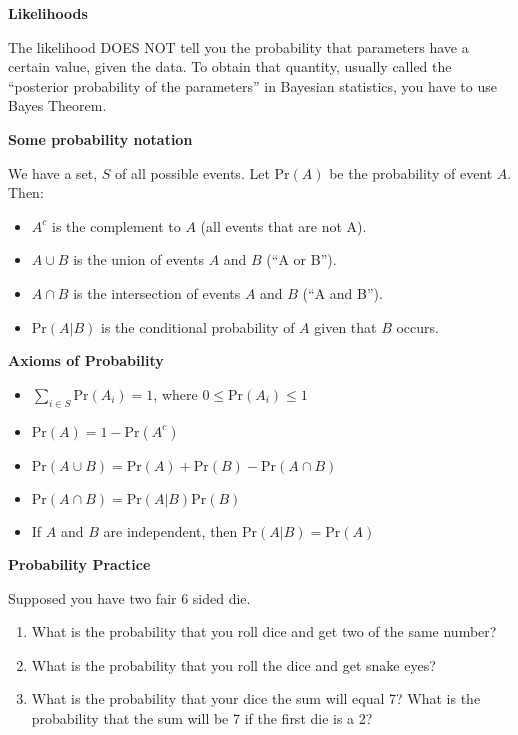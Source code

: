 \documentclass[12pt,xcolor=svgnames]{beamer}
\newcommand{\rd}{\color{red}}
\newcommand{\bl}{\color{blue}}
\newcommand{\theme}{\color{FireBrick}}
\newcommand{\sk}{\vspace{.4cm}}
\newcommand{\chap}[1]{{\theme \Large \bf #1} \sk}
\newcommand{\pr}{\text{Pr}}
\begin{document}
\begin{frame}
\chap{Likelihoods}

The likelihood {\rd DOES NOT} tell you the probability that parameters have a certain value, given the data. To obtain that quantity, usually called the ``posterior probability of the parameters'' in Bayesian statistics, you have to use Bayes Theorem. 


\end{frame}




\iffalse

\begin{frame}
\chap{Some probability notation} 

We have a {\bl set}, $S$ of all possible events. Let $\pr(A)$ be the probability of event $A$. Then:

\begin{itemize}
\item $A^c$ is the complement to $A$ (all events that are not A). 
\item $A \cup B$ is the union of events $A$ and $B$ (``A or B''). 
\item $A \cap B$ is the intersection of events $A$ and $B$ (``A and B'').
\item $\pr(A|B)$ is the conditional probability of $A$ given that $B$ occurs.  
\end{itemize}
\end{frame}


\begin{frame}
\chap{Axioms of Probability} 


\begin{itemize}
\item $\sum_{i \in S} \pr(A_i)=1$, where $0 \leq \pr(A_i) \leq 1$
\item $\pr(A)=1-\pr(A^c)$
\item $\pr(A \cup B) = \pr(A) + \pr(B) -\pr(A \cap B)$
\item $\pr(A \cap B) = \pr(A|B)\pr(B)$
\item If $A$ and $B$ are {\bl independent}, then $\pr(A|B) = \pr(A)$
\end{itemize}

\end{frame}



\begin{frame}
\chap{Probability Practice}

Supposed you have two fair 6 sided die. 
\begin{enumerate}
\item What is the probability that you roll dice and get two of the same number?
\item What is the probability that you roll the dice and get snake eyes?
\item What is the probability that your dice the sum will equal 7? What is the probability that the sum will be 7 if the first die is a 2?
\end{enumerate}
\end{frame}
\end{document}
